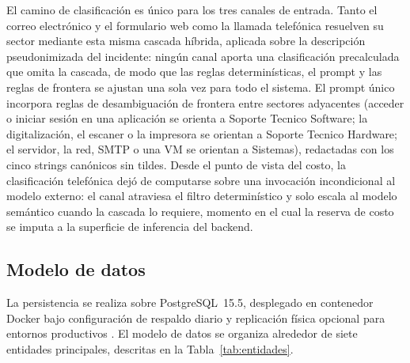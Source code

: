 El camino de clasificación es único para los tres canales de entrada. Tanto el correo electrónico y el formulario web como la llamada telefónica resuelven su sector mediante esta misma cascada híbrida, aplicada sobre la descripción pseudonimizada del incidente: ningún canal aporta una clasificación precalculada que omita la cascada, de modo que las reglas determinísticas, el prompt y las reglas de frontera se ajustan una sola vez para todo el sistema. El prompt único incorpora reglas de desambiguación de frontera entre sectores adyacentes (acceder o iniciar sesión en una aplicación se orienta a Soporte Tecnico Software; la digitalización, el escaner o la impresora se orientan a Soporte Tecnico Hardware; el servidor, la red, SMTP o una VM se orientan a Sistemas), redactadas con los cinco strings canónicos sin tildes. Desde el punto de vista del costo, la clasificación telefónica dejó de computarse sobre una invocación incondicional al modelo externo: el canal atraviesa el filtro determinístico y solo escala al modelo semántico cuando la cascada lo requiere, momento en el cual la reserva de costo se imputa a la superficie de inferencia del backend.

\subsection{Modelo de datos}\label{subsec:modelo-datos}

La persistencia se realiza sobre PostgreSQL~15.5, desplegado en contenedor Docker bajo configuración de respaldo diario y replicación física opcional para entornos productivos \parencite{PostgreSQL2024_docs}. El modelo de datos se organiza alrededor de siete entidades principales, descritas en la Tabla~\ref{tab:entidades}.

